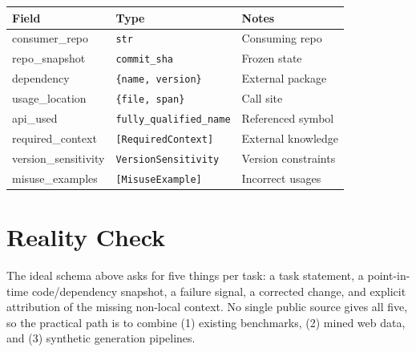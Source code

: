 \documentclass[a4paper,12pt]{article}
\begin{document}
\begin{tcolorbox}[title=DependencyUsage]
\footnotesize
\begin{tabularx}{\linewidth}{@{} l l Y @{}}
\toprule
\textbf{Field} & \textbf{Type} & \textbf{Notes} \\
\midrule
consumer\_repo & \texttt{str} & Consuming repo \\
repo\_snapshot & \texttt{commit\_sha} & Frozen state \\
dependency & \texttt{\{name, version\}} & External package \\
usage\_location & \texttt{\{file, span\}} & Call site \\
api\_used & \texttt{fully\_qualified\_name} & Referenced symbol \\
required\_context & \texttt{[RequiredContext]} & External knowledge \\
version\_sensitivity & \texttt{VersionSensitivity} & Version constraints \\
misuse\_examples & \texttt{[MisuseExample]} & Incorrect usages \\
\bottomrule
\end{tabularx}
\end{tcolorbox}

%
%
%
%
%
\newpage
\section{Reality Check}


The ideal schema above asks for five things per task: a task statement, a point-in-time code/dependency snapshot, a failure signal, a corrected change, and explicit attribution of the missing non-local context. No single public source gives all five, so the practical path is to combine (1) existing benchmarks, (2) mined web data, and (3) synthetic generation pipelines.
\end{document}
